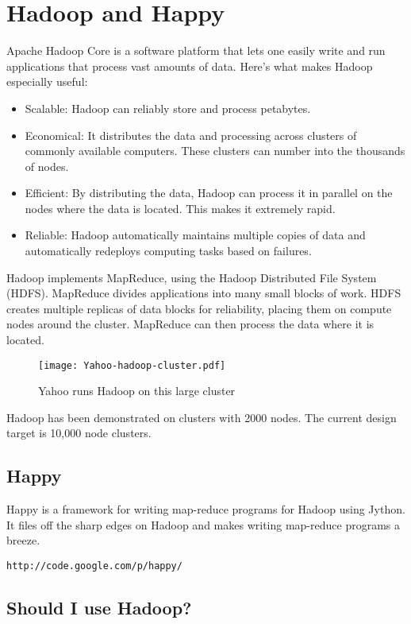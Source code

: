 \documentclass[11pt]{article}
\begin{document}
\section{Hadoop and Happy}

Apache Hadoop Core is a software platform that lets one easily write
and run applications that process vast amounts of data. Here's what
makes Hadoop especially useful:
\begin{itemize}
\item Scalable: Hadoop can reliably store and process petabytes.
\item Economical: It distributes the data and processing across clusters of commonly available computers. These clusters can number into the thousands of nodes.
\item Efficient: By distributing the data, Hadoop can process it in parallel on the nodes where the data is located. This makes it extremely rapid.
\item Reliable: Hadoop automatically maintains multiple copies of data and automatically redeploys computing tasks based on failures.
\end{itemize}
Hadoop implements MapReduce, using the Hadoop Distributed File System
(HDFS). MapReduce divides applications into many small blocks of work.
HDFS creates multiple replicas of data blocks for reliability, placing
them on compute nodes around the cluster. MapReduce can then process
the data where it is located.

\begin{figure}
\begin{center}
\texttt{[image: Yahoo-hadoop-cluster.pdf]}
\end{center}
\caption{Yahoo runs Hadoop on this large cluster}
\label{F:hadoopcluster}
\end{figure}

Hadoop has been demonstrated on clusters with 2000 nodes. The current
design target is 10,000 node clusters.

\subsection{Happy}

Happy is a framework for writing map-reduce programs for Hadoop using
Jython. It files off the sharp edges on Hadoop and makes writing
map-reduce programs a breeze.

{\tt http://code.google.com/p/happy/}

\subsection{Should I use Hadoop?}
\end{document}
